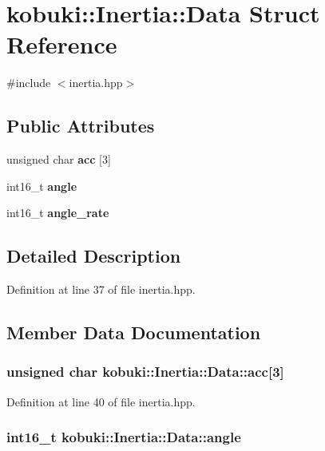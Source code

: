 \section{kobuki\-:\-:\-Inertia\-:\-:\-Data \-Struct \-Reference}
\label{structkobuki_1_1Inertia_1_1Data}


{\ttfamily \#include $<$inertia.\-hpp$>$}

\subsection*{\-Public \-Attributes}
\begin{DoxyCompactItemize}
\item 
unsigned char {\bf acc} [3]
\item 
int16\-\_\-t {\bf angle}
\item 
int16\-\_\-t {\bf angle\-\_\-rate}
\end{DoxyCompactItemize}


\subsection{\-Detailed \-Description}


\-Definition at line 37 of file inertia.\-hpp.



\subsection{\-Member \-Data \-Documentation}
\subsubsection[{acc}]{\setlength{\rightskip}{0pt plus 5cm}unsigned char {\bf kobuki\-::\-Inertia\-::\-Data\-::acc}[3]}\label{structkobuki_1_1Inertia_1_1Data_a0ad4a7f653724bcedcb5d0eea0347352}


\-Definition at line 40 of file inertia.\-hpp.

\subsubsection[{angle}]{\setlength{\rightskip}{0pt plus 5cm}int16\-\_\-t {\bf kobuki\-::\-Inertia\-::\-Data\-::angle}}\label{structkobuki_1_1Inertia_1_1Data_a482542389a45c932f36ce4cda902babc}



